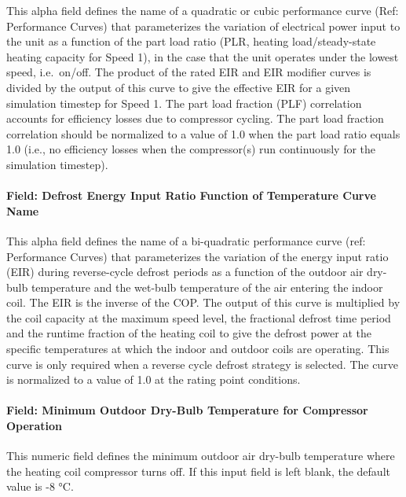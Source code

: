 This alpha field defines the name of a quadratic or cubic performance curve (Ref: Performance Curves) that parameterizes the variation of electrical power input to the unit as a function of the part load ratio (PLR, heating load/steady-state heating capacity for Speed 1), in the case that the unit operates under the lowest speed, i.e.~on/off. The product of the rated EIR and EIR modifier curves is divided by the output of this curve to give the effective EIR for a given simulation timestep for Speed 1. The part load fraction (PLF) correlation accounts for efficiency losses due to compressor cycling. The part load fraction correlation should be normalized to a value of 1.0 when the part load ratio equals 1.0 (i.e., no efficiency losses when the compressor(s) run continuously for the simulation timestep).

\paragraph{Field: Defrost Energy Input Ratio Function of Temperature Curve Name}\label{field-defrost-energy-input-ratio-function-of-temperature-curve-name-2}

This alpha field defines the name of a bi-quadratic performance curve (ref: Performance Curves) that parameterizes the variation of the energy input ratio (EIR) during reverse-cycle defrost periods as a function of the outdoor air dry-bulb temperature and the wet-bulb temperature of the air entering the indoor coil. The EIR is the inverse of the COP. The output of this curve is multiplied by the coil capacity at the maximum speed level, the fractional defrost time period and the runtime fraction of the heating coil to give the defrost power at the specific temperatures at which the indoor and outdoor coils are operating. This curve is only required when a reverse cycle defrost strategy is selected. The curve is normalized to a value of 1.0 at the rating point conditions.

\paragraph{Field: Minimum Outdoor Dry-Bulb Temperature for Compressor Operation}\label{field-minimum-outdoor-dry-bulb-temperature-for-compressor-operation-2}

This numeric field defines the minimum outdoor air dry-bulb temperature where the heating coil compressor turns off. If this input field is left blank, the default value is -8 °C.

